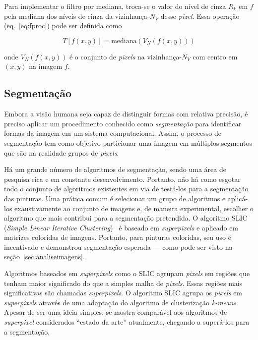 Para implementar o filtro por mediana, troca-se o valor do nível de
cinza $R_k$ em $f$ pela mediana dos níveis de cinza da
vizinhança-$N_V$ desse \textit{pixel}. Essa operação
(eq.~\ref{eq:fproc}) pode ser definida como

\begin{equation}
  T[f(x,y)] = \text{mediana}(V_N(f(x,y)))
\end{equation}

\noindent onde $V_N(f(x,y))$ é o conjunto de \textit{pixels} na
vizinhança-$N_V$ com centro em $(x,y)$ na imagem $f$.

\subsection{Segmentação}
\label{sec:slic}

Embora a visão humana seja capaz de distinguir formas com relativa
precisão, é preciso aplicar um procedimento conhecido
como \emph{segmentação} para identificar formas da imagem em um
sistema computacional. Assim, o processo de segmentação tem como
objetivo particionar uma imagem em múltiplos segmentos que são na
realidade grupos de \textit{pixels}.

Há um grande número de algoritmos de segmentação, sendo uma área de
pesquisa rica e em constante desenvolvimento. Portanto, não há como
esgotar todo o conjunto de algoritmos existentes em via de testá-los
para a segmentação das pinturas. Uma prática comum é selecionar um
grupo de algoritmos e aplicá-los exaustivamente ao conjunto de imagens
e, de maneira experimental, escolher o algoritmo que mais contribui
para a segmentação pretendida. O algoritmo SLIC (\textit{Simple Linear
Iterative Clustering})~\cite{slic} é baseado em
\textit{superpixels} e aplicado em matrizes coloridas de imagens. Portanto,
para pinturas coloridas, seu uso é incentivado e demonstrou
segmentação esperada --- como pode ser visto na
seção~\ref{sec:analiseimagens}.

Algoritmos baseados em \textit{superpixels} como o SLIC agrupam \textit{pixels} em
regiões que tenham maior significado do que a simples malha de
\textit{pixels}. Essas regiões mais significativas são chamadas \textit{superpixels}. O
algoritmo SLIC agrupa os \textit{pixels} em \textit{superpixels}
através de uma adaptação do algoritmo de
clusterização \emph{k-means}. Apesar de ser uma ideia simples, se
mostra comparável aos algoritmos de \textit{superpixel} considerados
``estado da arte'' atualmente, chegando a superá-los para a
segmentação.~\cite{slic}

